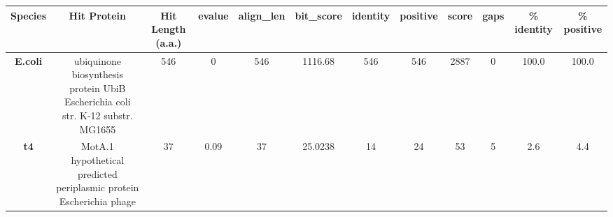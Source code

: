 \begin{tabular}{|c|c|c|c|c|c|c|c|c|c|c|c|} \hline
\textbf{Species} & \textbf{Hit Protein} & \textbf{Hit Length (a.a.)} & \textbf{evalue} & \textbf{align\_len} & \textbf{bit\_score} & \textbf{identity} & \textbf{positive} & \textbf{score} & \textbf{gaps} & \textbf{\% identity} & \textbf{\% positive} \\ \hline
\textbf{E.coli} & ubiquinone biosynthesis protein UbiB Escherichia coli str. K-12 substr. MG1655 & 546 & 0 & 546 & 1116.68 & 546 & 546 & 2887 & 0 & 100.0 & 100.0\\
\textbf{t4} & MotA.1 hypothetical predicted periplasmic protein Escherichia phage  & 37 & 0.09 & 37 & 25.0238 & 14 & 24 & 53 & 5 & 2.6 & 4.4\\
\hline \end{tabular}
